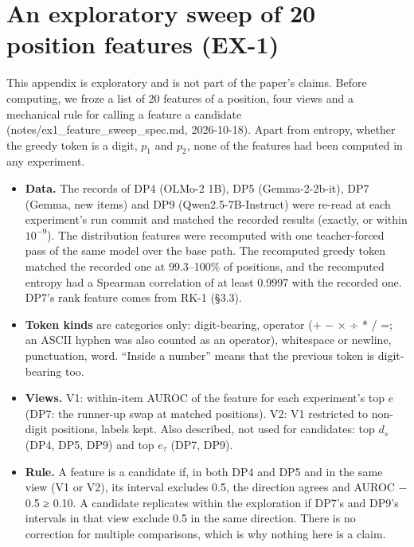 \documentclass[
  10pt,
  a4paper,
]{article}
\providecommand{\tightlist}{%
  \setlength{\itemsep}{0pt}\setlength{\parskip}{0pt}}
\begin{document}
\hypertarget{an-exploratory-sweep-of-20-position-features-ex-1}{%
\section{An exploratory sweep of 20 position features (EX-1)}\label{an-exploratory-sweep-of-20-position-features-ex-1}}

This appendix is exploratory and is not part of the paper's claims. Before computing, we froze a list of 20 features of a position, four views and a mechanical rule for calling a feature a candidate
(notes/ex1\_feature\_sweep\_spec.md, 2026-10-18). Apart from entropy, whether the greedy token is a digit, \(p_1\) and \(p_2\), none of the features had been computed in any experiment.

\begin{itemize}
\tightlist
\item
  \textbf{Data.} The records of DP4 (OLMo-2 1B), DP5 (Gemma-2-2b-it), DP7 (Gemma, new items) and DP9 (Qwen2.5-7B-Instruct) were re-read at each experiment's run commit and matched the recorded results
  (exactly, or within \(10^{-9}\)). The distribution features were recomputed with one teacher-forced pass of the same model over the base path. The recomputed greedy token matched the recorded one at
  99.3--100\% of positions, and the recomputed entropy had a Spearman correlation of at least 0.9997 with the recorded one. DP7's rank feature comes from RK-1 (§3.3).
\item
  \textbf{Token kinds} are categories only: digit-bearing, operator (+ − × ÷ * / =; an ASCII hyphen was also counted as an operator), whitespace or newline, punctuation, word. ``Inside a number''
  means that the previous token is digit-bearing too.
\item
  \textbf{Views.} V1: within-item AUROC of the feature for each experiment's top \(e\) (DP7: the runner-up swap at matched positions). V2: V1 restricted to non-digit positions, labels kept. Also
  described, not used for candidates: top \(d_{s}\) (DP4, DP5, DP9) and top \(e_{\tau}\) (DP7, DP9).
\item
  \textbf{Rule.} A feature is a candidate if, in both DP4 and DP5 and in the same view (V1 or V2), its interval excludes 0.5, the direction agrees and \textbar AUROC − 0.5\textbar{} ≥ 0.10. A
  candidate replicates within the exploration if DP7's and DP9's intervals in that view exclude 0.5 in the same direction. There is no correction for multiple comparisons, which is why nothing here is
  a claim.
\end{itemize}
\end{document}
